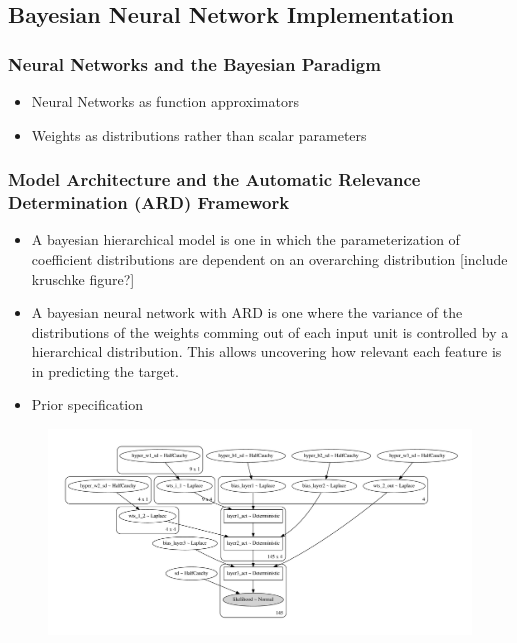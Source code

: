 \documentclass[10pt,a4paper]{article}
\begin{document}
		\subsection{Bayesian Neural Network Implementation}
			\subsubsection{Neural Networks and the Bayesian Paradigm}
				\begin{itemize}
					\item Neural Networks as function approximators
					\item Weights as distributions rather than scalar parameters
				\end{itemize}
			\subsubsection{Model Architecture and the Automatic Relevance Determination (ARD) Framework}
				\begin{itemize}
				    \item A bayesian hierarchical model is one in which the parameterization of coefficient distributions are dependent on an overarching distribution [include kruschke figure?]
				    \item A bayesian neural network with ARD is one where the variance of the distributions of the weights comming out of each input unit is controlled by a hierarchical distribution. This allows uncovering how relevant each feature is in predicting the target.
					\item Prior specification
				\end{itemize}
				\begin{figure}
				    \centering
				    \includegraphics[scale=0.4]{bnn_l2_4_4_robust.pdf}
				\end{figure}
\end{document}
